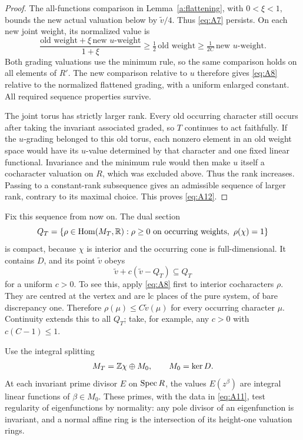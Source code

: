 \begin{proof}
The all-functions comparison in Lemma~\ref{a:flattening}, with
\(0<\xi<1\), bounds the new actual valuation below by
\(\tilde v/4\). Thus \eqref{eq:A7} persists. On each new joint weight,
its normalized value is
\[
 \frac{\text{old weight}+\xi\,\text{new }u\text{-weight}}{1+\xi}
       \geq\tfrac12\,\text{old weight}
       \geq\tfrac1{2C}\,\text{new }u\text{-weight}.
\]
Both grading valuations use the minimum rule, so the same comparison
holds on all elements of \(R'\). The new comparison relative to \(u\)
therefore gives \eqref{eq:A8} relative to the normalized flattened
grading, with a uniform enlarged constant. All required sequence
properties survive.

The joint torus has strictly larger rank. Every old occurring character
still occurs after taking the invariant associated graded, so \(T\)
continues to act faithfully. If the \(u\)-grading belonged to this old
torus, each nonzero element in an old weight space would have its
\(u\)-value determined by that character and one fixed linear
functional. Invariance and the minimum rule would then make \(u\)
itself a cocharacter valuation on \(R\), which was excluded above.
Thus the rank increases. Passing to a constant-rank subsequence gives
an admissible sequence of larger rank, contrary to its maximal choice.
This proves \eqref{eq:A12}.
\end{proof}

Fix this sequence from now on. The dual section
\[
 Q_T=\{\rho\in\Hom(M_T,\R):
          \rho\geq0\text{ on occurring weights},\ \rho(\chi)=1\}
\]
is compact, because \(\chi\) is interior and the occurring cone is
full-dimensional. It contains \(D\), and its point \(\tilde v\) obeys
\[
                    \tilde v+c(\tilde v-Q_T)\subseteq Q_T
\]
for a uniform \(c>0\). To see this, apply \eqref{eq:A8} first to
interior cocharacters \(\rho\). They are centred at the vertex and are
lc places of the pure system, of bare discrepancy one. Therefore
\(\rho(\mu)\leq C\tilde v(\mu)\) for every occurring character
\(\mu\). Continuity extends this to all \(Q_T\); take, for example,
any \(c>0\) with \(c(C-1)\leq1\).

Use the integral splitting
\[
                  M_T=\mathbb Z\chi\oplus M_0,\qquad M_0=\ker D.
\]
At each invariant prime divisor \(E\) on \(\operatorname{Spec} R\), the values
\(E(z^\beta)\) are integral linear functions of \(\beta\in M_0\).
These primes, with the data in \eqref{eq:A11}, test regularity of
eigenfunctions by normality: any pole divisor of an eigenfunction is
invariant, and a normal affine ring is the intersection of its
height-one valuation rings.

